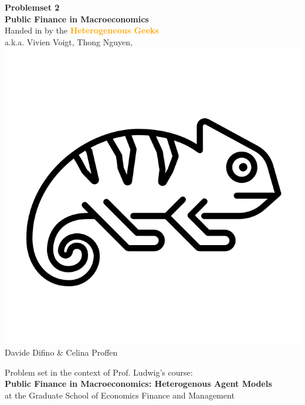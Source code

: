 \documentclass[12pt,a4paper]{article}
\begin{document}
\begin{center}
       \vspace*{1cm}
       \huge\textbf{Problemset 2} \\
       \vspace{0.4cm}
       \large \textbf{Public Finance in Macroeconomics} \\
       \vspace{0.5cm}
        \large Handed in by the \textcolor{orange}{\textbf{Heterogeneous Geeks}} \\ 
        \vspace{0.3cm}
        a.k.a. Vivien Voigt, Thong Nguyen, \includegraphics[scale=0.06]{geek.png}\\Davide Difino \& Celina Proffen \\
       \vspace{1.5cm}
       \vfill
       
       
        Problem set in the context of Prof. Ludwig's course: \\
        \textbf{Public Finance in Macroeconomics: Heterogenous Agent Models}\\
        at the Graduate School of Economics Finance and Management
       \vspace{0.8cm}
   \end{center}
\end{document}
